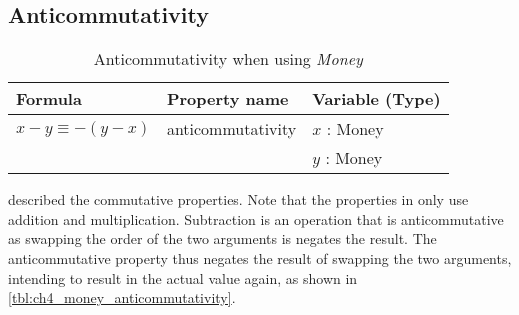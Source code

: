 \subsection*{Anticommutativity}
\label{ssct:properties_anticommutativity}
\begin{table}[!ht]
\centering
\begin{tabular}{lll}
\hline
                        \textbf{Formula}        & \textbf{Property name} & \textbf{Variable (Type)}    \\ \hline
\rowcolor[HTML]{EFEFEF} $x - y \equiv -(y - x)$ & anticommutativity      & $x$ : Money                 \\
\rowcolor[HTML]{EFEFEF}                         &                        & $y$ : Money                 \\ \hline
\end{tabular}
\caption{Anticommutativity when using \textit{Money}}
\label{tbl:ch4_money_anticommutativity}
\end{table}
\FloatBarrier\noindent
 described the commutative properties.
Note that the properties in  only use
addition and multiplication. Subtraction is an operation that is anticommutative
as swapping the order of the two arguments is negates the result. The
anticommutative property thus negates the result of swapping the two arguments,
intending to result in the actual value again, as shown in
\autoref{tbl:ch4_money_anticommutativity}.
